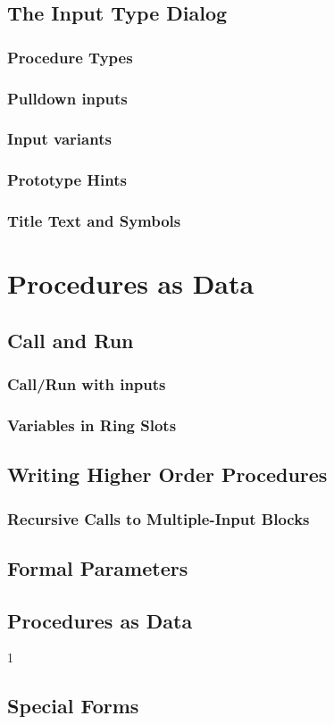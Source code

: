 \documentclass[a4paper]{report}
\begin{document}
\section{The \Snap{} Input Type Dialog}
\subsection{Procedure Types}
\subsection{Pulldown inputs}
\subsection{Input variants}
\subsection{Prototype Hints}
\subsection{Title Text and Symbols}
\chapter{Procedures as Data}
\section{Call and Run}
\subsection{Call/Run with inputs}
\subsection{Variables in Ring Slots}
\section{Writing Higher Order Procedures}
\subsection{Recursive Calls to Multiple-Input Blocks}
\section{Formal Parameters}
\section{Procedures as Data}
1\section{Special Forms}
\end{document}

